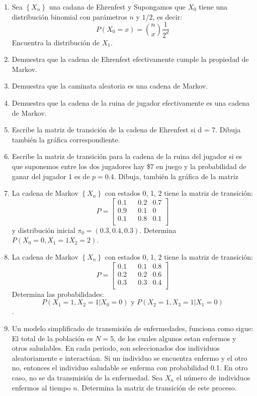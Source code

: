 \documentclass{report}
\begin{document}
\begin{enumerate}
\begin{enumerate}
    \end{enumerate}
    \item Sea $\left\{X_n\right\}$ una cadana de Ehrenfest y Supongamos que $X_0$ tiene una distribución binomial con parámetros $n$ y $1/2$, es decir:
    $$
    P\left(X_0= x\right) = \binom{n}{x}\frac{1}{2^d}
    $$
    Encuentra la distribución de $X_1$.
    \item Demuestra que la cadena de Ehrenfest efectivamente cumple la propiedad de Markov.
    \item Demuestra que la caminata aleatoria es una cadena de Markov.
    \item Demuestra que la cadena de la ruina de jugador efectivamente es una cadena de Markov.
    \item Escribe la matriz de transición de la cadena de Ehrenfest si d = 7. Dibuja también la gráfica correspondiente.
    \item Escribe la matriz de transición para la cadena de la ruina del jugador si es que suponemos entre los dos jugadores hay \$7 en juego y la probabilidad de ganar del jugador 1 es de $p = 0.4$. Dibuja, también la gráfica de la matriz
    \item La cadena de Markov $\left\{X_n\right\}$ con estados 0, 1, 2 tiene la matriz de transición:
    $$P= \left[
    \begin{matrix}
        0.1 & & 0.2 & 0.7 \\
        0.9 & & 0.1 &   0 \\
        0.1 & & 0.8 & 0.1 \\
    \end{matrix}
    \right]
    $$
y distribución inicial $\pi_0= (0.3, 0.4, 0.3)$. Determina $P\left(X_0=0, X_1 = 1 X_2 = 2\right)$.
\item La cadena de Markov $\left\{X_n\right\}$ con estados 0, 1, 2 tiene la matriz de transición:
$$P= \left[
\begin{matrix}
    0.1 & & 0.1 & 0.8 \\
    0.2 & & 0.2 & 0.6 \\
    0.3 & & 0.3 & 0.4 \\
\end{matrix}
\right]
$$
Determina las probabilidades:
 $$P\left(\left. X_1=1, X_2 = 1 \right\vert  X_0 = 0\right) \textrm{ y } P\left(\left. X_2=1, X_3 = 1 \right\vert  X_1 = 0\right)$$.

\item Un modelo simplificado de transmisión de enfermedades, funciona como sigue: El total de la población es $N=5$, de los cuales algunos estan enfermos y otros saludables. En cada periodo, son seleccionados dos individuos aleatoriamente e interactúan. Si un individuo se encuentra enfermo y el otro no, entonces el individuo saludable se enferma con probabilidad 0.1. En otro caso, no se da transmisión de la enfermedad. Sea $X_n$ el número de individuos enfermos al tiempo $n$. Determina la matriz de transición de este proceso.
\end{enumerate}
 
\end{document}
